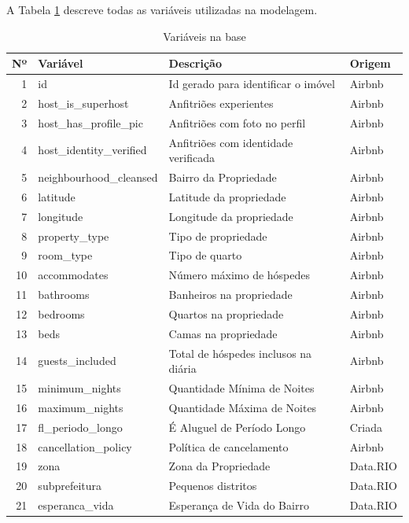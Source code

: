 \documentclass[
	12pt,				%
	a4paper,		%
	oneside,    %
	chapter=TITLE,		   %
	section=TITLE,		   %
	subsection=TITLE,	   %
	subsubsection=TITLE, %
	english,			%
	french,				%
	spanish,			%
	brazil,				%
]{abntex2}
\begin{document}
A Tabela \ref{tab:desc_variaveis} descreve todas as variáveis utilizadas
na modelagem.

\begin{table}

\caption{\label{tab:desc_variaveis}Variáveis na base}
\centering
\begin{tabular}[t]{r|l|l|l}
\hline
Nº & Variável & Descrição & Origem\\
\hline
1 & id & Id gerado para identificar o imóvel & Airbnb\\
\hline
2 & host\_is\_superhost & Anfitriões experientes & Airbnb\\
\hline
3 & host\_has\_profile\_pic & Anfitriões com foto no perfil & Airbnb\\
\hline
4 & host\_identity\_verified & Anfitriões com identidade verificada & Airbnb\\
\hline
5 & neighbourhood\_cleansed & Bairro da Propriedade & Airbnb\\
\hline
6 & latitude & Latitude da propriedade & Airbnb\\
\hline
7 & longitude & Longitude da propriedade & Airbnb\\
\hline
8 & property\_type & Tipo de propriedade & Airbnb\\
\hline
9 & room\_type & Tipo de quarto & Airbnb\\
\hline
10 & accommodates & Número máximo de hóspedes & Airbnb\\
\hline
11 & bathrooms & Banheiros na propriedade & Airbnb\\
\hline
12 & bedrooms & Quartos na propriedade & Airbnb\\
\hline
13 & beds & Camas na propriedade & Airbnb\\
\hline
14 & guests\_included & Total de hóspedes inclusos na diária & Airbnb\\
\hline
15 & minimum\_nights & Quantidade Mínima de Noites & Airbnb\\
\hline
16 & maximum\_nights & Quantidade Máxima de Noites & Airbnb\\
\hline
17 & fl\_periodo\_longo & É Aluguel de Período Longo & Criada\\
\hline
18 & cancellation\_policy & Política de cancelamento & Airbnb\\
\hline
19 & zona & Zona da Propriedade & Data.RIO\\
\hline
20 & subprefeitura & Pequenos distritos & Data.RIO\\
\hline
21 & esperanca\_vida & Esperança de Vida do Bairro & Data.RIO\\

\end{tabular}
\end{table}
\end{document}
